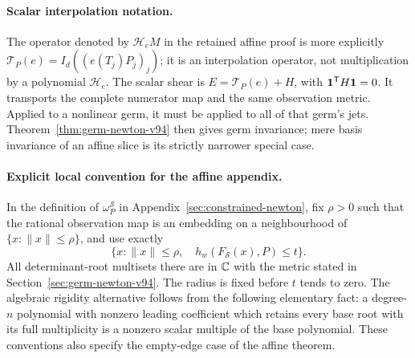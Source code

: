 \paragraph{Scalar interpolation notation.}
The operator denoted by $\mathcal H_eM$ in the retained affine proof
is more explicitly
$\mathcal T_P(e)=I_d((e(T_j)P_j)_j)$; it is an interpolation
operator, not multiplication by a polynomial $\mathcal H_e$.
The scalar shear is $E=\mathcal T_P(e)+H$, with
$\mathbf 1^{\mathsf T}H\mathbf 1=0$. It transports the complete numerator
map and the same observation metric. Applied to a nonlinear germ,
it must be applied to all of that germ's jets. Theorem~\ref{thm:germ-newton-v94}
then gives germ invariance; mere basis invariance of an affine
slice is its strictly narrower special case.

\paragraph{Explicit local convention for the affine appendix.}
In the definition of $\omega_P^{\mathcal S}$ in
Appendix~\ref{sec:constrained-newton}, fix $\rho>0$ such that the
rational observation map is an embedding on a neighbourhood of
$\{x:\|x\|\le\rho\}$, and use exactly
\[
 \{x:\|x\|\le\rho,\quad h_w(F_{\mathcal S}(x),P)\le t\}.
\]
All determinant-root multisets there are in $\mathbb C$ with the metric
stated in Section~\ref{sec:germ-newton-v94}. The radius is fixed
before $t$ tends to zero. The algebraic rigidity alternative follows
from the following elementary fact: a degree-$n$ polynomial with
nonzero leading coefficient which retains every base root with its
full multiplicity is a nonzero scalar multiple of the base polynomial.
These conventions also specify the empty-edge case of the affine theorem.
